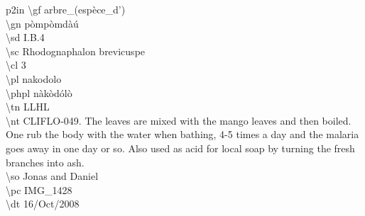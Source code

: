 \begin{table}
{{\begin{Itabular}{p{2in}}
\textbackslash gf arbre\_(espèce\_d')\\
\textbackslash gn pòmpòmdàú\\
\textbackslash sd I.B.4\\
\textbackslash sc Rhodognaphalon brevicuspe\\
\textbackslash cl 3\\
\textbackslash pl nakodolo\\
\textbackslash phpl nàkòdólò\\
\textbackslash tn LLHL\\
\textbackslash nt CLIFLO-049. The leaves are mixed with the mango leaves and
then boiled. One rub the body with the water when bathing, 4-5 times a day and
the malaria goes away in one day or so. Also used as  acid for local soap by
turning the fresh branches into ash.\\
\textbackslash so Jonas and Daniel\\
\textbackslash pc IMG\_1428\\
\textbackslash dt 16/Oct/2008\\
\end{Itabular}
}
}
\end{table}


